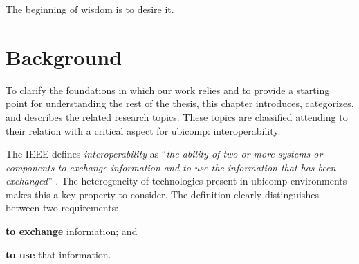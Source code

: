 
\begin{savequote}[50mm]
The beginning of wisdom is to desire it.
\end{savequote}


\chapter{Background}
\label{cha:background}

\ifpdf
    \graphicspath{{\pathchaptwo/figures/PNG/}{\pathchaptwo/figures/PDF/}{\pathchaptwo/figures/}}
\else
    \graphicspath{{\pathchaptwo/figures/EPS/}{\pathchaptwo/figures/}}
\fi



To clarify the foundations in which our work relies and to provide a starting point for understanding the rest of the thesis,
this chapter introduces, categorizes, and describes the related research topics. %
These topics are classified attending to their relation with a critical aspect for \ac{ubicomp}: interoperability.



The IEEE defines \emph{interoperability} as ``\emph{the ability of two or more systems or components to exchange information and to use the information that has been exchanged}'' \citep{_ieee_1990}.
The heterogeneity of technologies present in \ac{ubicomp} environments makes this a key property to consider.
The definition clearly distinguishes between two requirements: %
\begin{enumerate*}[label=\itshape\bfseries(\arabic*\upshape)]
  \item \textbf{to exchange} information; and
  \item \textbf{to use} that information. %
\end{enumerate*}

